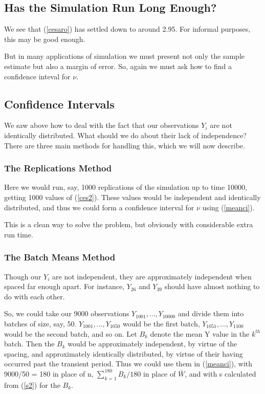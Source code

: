 \subsection{Has the Simulation Run Long Enough?}

We see that (\ref{cesaro}) has settled down to around 2.95.  For
informal purposes, this may be good enough.

But in many applications of simulation we must present not only the
sample estimate but also a margin of error.  So, again we must ask how
to find a confidence inteval for $\nu$.

\subsection{Confidence Intervals}

We saw above how to deal with the fact that our observations $Y_i$ are
not identically distributed.  What should we do about their lack of
independence?  There are three main methods for handling this, which we
will now describe.

\subsubsection{The Replications Method}

Here we would run, say, 1000 replications of the simulation up to time
10000, getting 1000 values of (\ref{ces2}).  These values would be
independent and identically distributed, and thus we could form a
confidence interval for $\nu$ using (\ref{meanci}).

This is a clean way to solve the problem, but obviously with
considerable extra run time.

\subsubsection{The Batch Means Method}

Though our $Y_i$ are not independent, they are approximately independent
when spaced far enough apart.  For instance, $Y_{26}$ and $Y_{39}$
should have almost nothing to do with each other.

So, we could take our 9000 observations $Y_{1001},...,Y_{10000}$ and
divide them into batches of size, say, 50.  $Y_{1001},...,Y_{1050}$
would be the first batch, $Y_{1051},...,Y_{1100}$ would be the second
batch, and so on.  Let $B_k$ denote the mean Y value in the $k^{th}$
batch.  Then the $B_k$ would be approximately independent, by virtue of
the spacing, and approximately identically distributed, by virtue of
their having occurred past the transient period.  Thus we could use them
in (\ref{meanci}), with 9000/50 = 180 in place of n,
$\sum_{k=1}^{180}B_k/180$ in place of $\bar{W}$, and with s calculated
from (\ref{s2}) for the $B_k$. 

